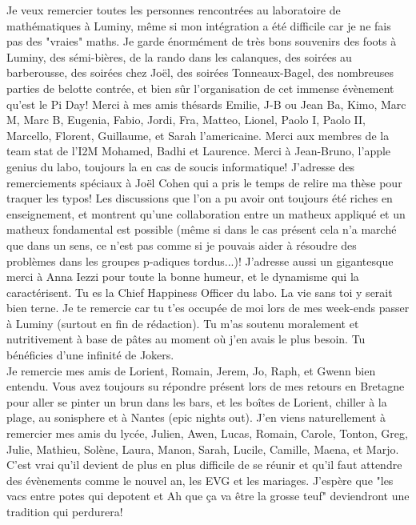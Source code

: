Je veux remercier toutes les personnes rencontrées au laboratoire de mathématiques à Luminy, même si mon intégration a été difficile car je ne fais pas des "vraies" maths. Je garde énormément de très bons souvenirs des foots à Luminy, des sémi-bières, de la rando dans les calanques, des soirées au barberousse, des soirées chez Joël, des soirées Tonneaux-Bagel, des nombreuses parties de belotte contrée, et bien sûr l'organisation de cet immense évènement qu'est le Pi Day! Merci à mes amis thésards Emilie, J-B ou Jean Ba, Kimo, Marc M, Marc B, Eugenia, Fabio, Jordi, Fra, Matteo, Lionel, Paolo I, Paolo II, Marcello, Florent, Guillaume, et Sarah l'americaine. Merci aux membres de la team stat de l'I2M Mohamed, Badhi et Laurence. Merci à Jean-Bruno, l'apple genius du labo, toujours la en cas de soucis informatique! J'adresse des remerciements spéciaux à Joël Cohen qui a pris le temps de relire ma thèse pour traquer les typos! Les discussions que l'on a pu avoir ont toujours été riches en enseignement, et montrent qu'une collaboration entre un matheux appliqué et un matheux fondamental est possible (même si dans le cas présent cela n'a marché que dans un sens, ce n'est pas comme si je pouvais aider à résoudre des problèmes dans les groupes p-adiques tordus...)! J'adresse aussi un gigantesque merci à Anna Iezzi pour toute la bonne humeur, et le dynamisme qui la caractérisent. Tu es la Chief Happiness Officer du labo. La vie sans toi y serait bien terne. Je te remercie car tu t'es occupée de moi lors de mes week-ends passer à Luminy (surtout en fin de rédaction). Tu m'as soutenu moralement et nutritivement à base de pâtes au moment où j'en avais le plus besoin. Tu bénéficies d'une infinité de Jokers.\\

Je remercie mes amis de Lorient, Romain, Jerem, Jo, Raph, et Gwenn bien entendu. Vous avez toujours su répondre présent lors de mes retours en Bretagne pour aller se pinter un brun dans les bars, et les boîtes de Lorient, chiller à la plage, au sonisphere et à Nantes (epic nights out). J'en viens naturellement à remercier mes amis du lycée, Julien, Awen, Lucas, Romain, Carole, Tonton, Greg, Julie, Mathieu, Solène, Laura, Manon, Sarah, Lucile, Camille, Maena, et Marjo. C'est vrai qu'il devient de plus en plus difficile de se réunir et qu'il faut attendre des évènements comme le nouvel an, les EVG et les mariages. J'espère que "les vacs entre potes qui depotent et Ah que ça va être la grosse teuf" deviendront une tradition qui perdurera!\\

